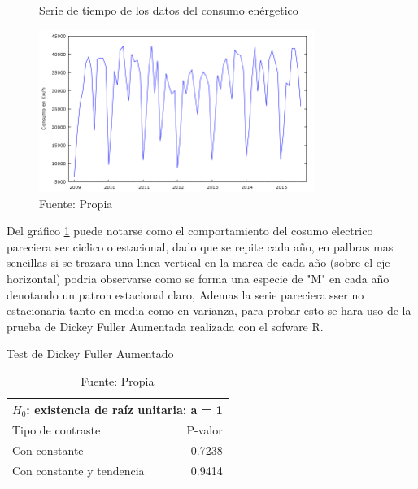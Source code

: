 \documentclass[12pt,letterpaper]{report}
\begin{document}
\begin{figure}[htb]

\centering
\caption{Serie de tiempo de los datos del consumo enérgetico} 
\includegraphics [width=0.8\textwidth]{Graf1}
\caption*{Fuente: Propia} \label{Graf}

\end{figure}

Del gráfico \ref{Graf} puede notarse como el comportamiento del cosumo electrico pareciera ser ciclico o estacional, dado que se repite cada año, en palbras mas sencillas si se trazara una linea vertical en la marca de cada año (sobre el eje horizontal) podria observarse como se forma una especie de "M" en cada año denotando un patron estacional claro, Ademas la serie pareciera sser no estacionaria tanto en media como en varianza, para probar esto se hara uso de la prueba de Dickey Fuller Aumentada realizada con el sofware R.

\begin{Schunk}
\end{Schunk}

\begin{table}[ht]
\caption{Test de Dickey Fuller Aumentado} \label{Test1}
\centering
\begin{tabular}{lr}
\hline
  \hline
 \multicolumn{2}{|c|}{$H_0$: existencia de raíz unitaria: a = 1 }\\
 \hline
Tipo de contraste & P-valor\\ 
 \hline
Con constante & 0.7238\\
 \hline
Con constante y tendencia & 0.9414\\

\hline
   \hline
\end{tabular}
\caption*{Fuente: Propia}
\end{table}
\end{document}
